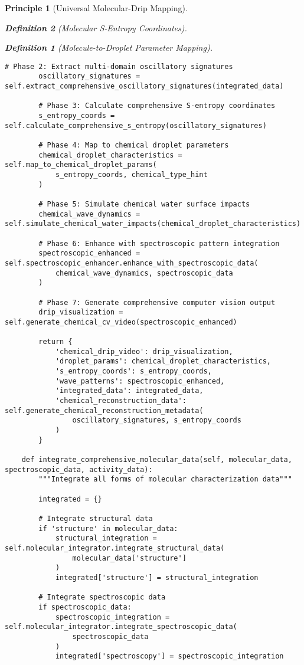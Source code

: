 \documentclass[12pt,a4paper]{article}
\newtheorem{definition}{Definition}
\newtheorem{principle}{Principle}
\begin{document}
\begin{principle}[Universal Molecular-Drip Mapping]
\begin{definition}[Molecular S-Entropy Coordinates]
\begin{definition}[Molecule-to-Droplet Parameter Mapping]
\begin{algorithm}
\begin{algorithmic}[1]
\begin{lstlisting}[style=pythonstyle, caption=Core Molecule-to-Drip Implementation for Comprehensive Chemical Analysis]
        # Phase 2: Extract multi-domain oscillatory signatures
        oscillatory_signatures = self.extract_comprehensive_oscillatory_signatures(integrated_data)
        
        # Phase 3: Calculate comprehensive S-entropy coordinates
        s_entropy_coords = self.calculate_comprehensive_s_entropy(oscillatory_signatures)
        
        # Phase 4: Map to chemical droplet parameters
        chemical_droplet_characteristics = self.map_to_chemical_droplet_params(
            s_entropy_coords, chemical_type_hint
        )
        
        # Phase 5: Simulate chemical water surface impacts
        chemical_wave_dynamics = self.simulate_chemical_water_impacts(chemical_droplet_characteristics)
        
        # Phase 6: Enhance with spectroscopic pattern integration
        spectroscopic_enhanced = self.spectroscopic_enhancer.enhance_with_spectroscopic_data(
            chemical_wave_dynamics, spectroscopic_data
        )
        
        # Phase 7: Generate comprehensive computer vision output
        drip_visualization = self.generate_chemical_cv_video(spectroscopic_enhanced)
        
        return {
            'chemical_drip_video': drip_visualization,
            'droplet_params': chemical_droplet_characteristics,
            's_entropy_coords': s_entropy_coords,
            'wave_patterns': spectroscopic_enhanced,
            'integrated_data': integrated_data,
            'chemical_reconstruction_data': self.generate_chemical_reconstruction_metadata(
                oscillatory_signatures, s_entropy_coords
            )
        }
    
    def integrate_comprehensive_molecular_data(self, molecular_data, spectroscopic_data, activity_data):
        """Integrate all forms of molecular characterization data"""
        
        integrated = {}
        
        # Integrate structural data
        if 'structure' in molecular_data:
            structural_integration = self.molecular_integrator.integrate_structural_data(
                molecular_data['structure']
            )
            integrated['structure'] = structural_integration
        
        # Integrate spectroscopic data
        if spectroscopic_data:
            spectroscopic_integration = self.molecular_integrator.integrate_spectroscopic_data(
                spectroscopic_data
            )
            integrated['spectroscopy'] = spectroscopic_integration
        

\end{lstlisting}
\end{algorithmic}
\end{algorithm}
\end{definition}
\end{definition}
\end{principle}
\end{document}
